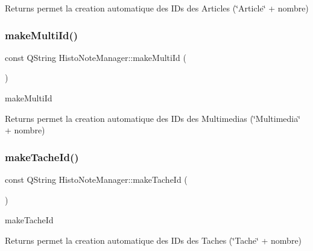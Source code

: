 \begin{DoxyReturn}{Returns}
permet la creation automatique des I\+Ds des Articles (\char`\"{}\+Article\char`\"{} + nombre) 
\end{DoxyReturn}
\mbox{\label{class_histo_note_manager_ac38463596cf0013c74646a7d9cc3d177}} 
\subsubsection{\texorpdfstring{make\+Multi\+Id()}{makeMultiId()}}
{\footnotesize\ttfamily const Q\+String Histo\+Note\+Manager\+::make\+Multi\+Id (\begin{DoxyParamCaption}{ }\end{DoxyParamCaption})}



make\+Multi\+Id 

\begin{DoxyReturn}{Returns}
permet la creation automatique des I\+Ds des Multimedias (\char`\"{}\+Multimedia\char`\"{} + nombre) 
\end{DoxyReturn}
\mbox{\label{class_histo_note_manager_aa78e22da815d3fb4c427946c00c7e03a}} 
\subsubsection{\texorpdfstring{make\+Tache\+Id()}{makeTacheId()}}
{\footnotesize\ttfamily const Q\+String Histo\+Note\+Manager\+::make\+Tache\+Id (\begin{DoxyParamCaption}{ }\end{DoxyParamCaption})}



make\+Tache\+Id 

\begin{DoxyReturn}{Returns}
permet la creation automatique des I\+Ds des Taches (\char`\"{}\+Tache\char`\"{} + nombre) 
\end{DoxyReturn}
\mbox{\label{class_histo_note_manager_a64f3060a3e56181f5389eaab0cd1573c}} 
